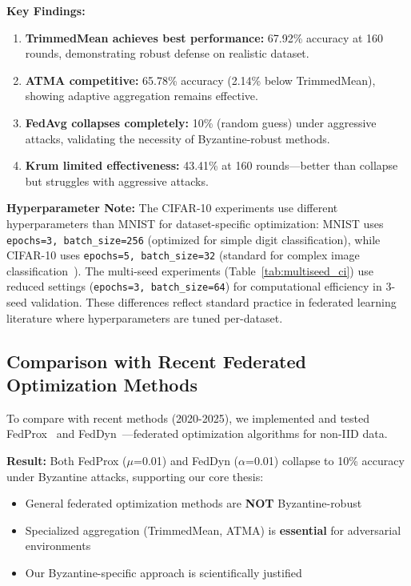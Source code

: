 \documentclass[12pt,a4paper,onecolumn]{article}
\begin{document}
\textbf{Key Findings:}
\begin{enumerate}
    \item \textbf{TrimmedMean achieves best performance:} 67.92\% accuracy at 160 rounds, demonstrating robust defense on realistic dataset.
    \item \textbf{ATMA competitive:} 65.78\% accuracy (2.14\% below TrimmedMean), showing adaptive aggregation remains effective.
    \item \textbf{FedAvg collapses completely:} 10\% (random guess) under aggressive attacks, validating the necessity of Byzantine-robust methods.
    \item \textbf{Krum limited effectiveness:} 43.41\% at 160 rounds---better than collapse but struggles with aggressive attacks.
\end{enumerate}

\textbf{Hyperparameter Note:} The CIFAR-10 experiments use different hyperparameters than MNIST for dataset-specific optimization: MNIST uses \texttt{epochs=3, batch\_size=256} (optimized for simple digit classification), while CIFAR-10 uses \texttt{epochs=5, batch\_size=32} (standard for complex image classification~\cite{mcmahan2017communication}). The multi-seed experiments (Table~\ref{tab:multiseed_ci}) use reduced settings (\texttt{epochs=3, batch\_size=64}) for computational efficiency in 3-seed validation. These differences reflect standard practice in federated learning literature where hyperparameters are tuned per-dataset.

\subsection{Comparison with Recent Federated Optimization Methods}

To compare with recent methods (2020-2025), we implemented and tested FedProx~\cite{li2020fedprox} and FedDyn~\cite{acar2021feddyn}---federated optimization algorithms for non-IID data.

\textbf{Result:} Both FedProx ($\mu$=0.01) and FedDyn ($\alpha$=0.01) collapse to 10\% accuracy under Byzantine attacks, supporting our core thesis:
\begin{itemize}
    \item General federated optimization methods are \textbf{NOT} Byzantine-robust
    \item Specialized aggregation (TrimmedMean, ATMA) is \textbf{essential} for adversarial environments
    \item Our Byzantine-specific approach is scientifically justified
\end{itemize}
\end{document}
